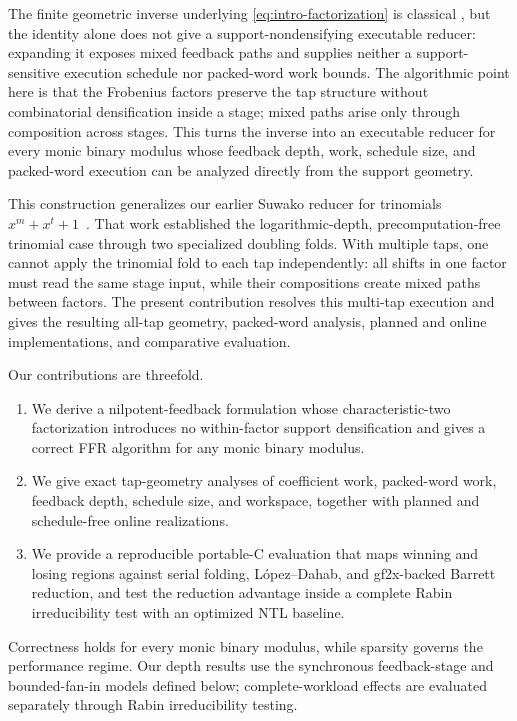 \documentclass{mcom-l}
\numberwithin{equation}{section}
\theoremstyle{definition}
\theoremstyle{remark}
\begin{document}
The finite geometric inverse underlying
\eqref{eq:intro-factorization} is classical
\cite{BiniPan1985,Kalorkoti1993}, but the identity alone does not give a
support-nondensifying executable reducer: expanding it exposes mixed feedback
paths and supplies neither a support-sensitive execution schedule nor
packed-word work bounds.
The algorithmic point here is that the Frobenius factors preserve the tap
structure without combinatorial densification inside a stage; mixed paths
arise only through composition across stages.  This turns the inverse into an
executable reducer for every monic binary modulus whose feedback depth, work,
schedule size, and packed-word execution can be analyzed directly from the
support geometry.

This construction generalizes our earlier Suwako reducer for trinomials
$x^m+x^t+1$~\cite{ZhouEtAl2025Suwako}.  That work established the
logarithmic-depth, precomputation-free trinomial case through two specialized
doubling folds.  With multiple taps, one cannot apply the trinomial fold to
each tap independently: all shifts in one factor must read the same stage
input, while their compositions create mixed paths between factors.  The
present contribution resolves this multi-tap execution and gives the resulting
all-tap geometry, packed-word analysis, planned and online implementations,
and comparative evaluation.

Our contributions are threefold.
\begin{enumerate}
\item We derive a nilpotent-feedback formulation whose characteristic-two
      factorization introduces no within-factor support densification and
      gives a correct FFR algorithm for any monic binary modulus.
\item We give exact tap-geometry analyses of coefficient work, packed-word
      work, feedback depth, schedule size, and workspace, together with
      planned and schedule-free online realizations.
\item We provide a reproducible portable-C evaluation that maps winning and
      losing regions against serial folding, L\'opez--Dahab, and gf2x-backed
      Barrett reduction, and test the reduction advantage inside a complete
      Rabin irreducibility test with an optimized NTL baseline.
\end{enumerate}

Correctness holds for every monic binary modulus, while sparsity governs the
performance regime.  Our depth results use the synchronous feedback-stage and
bounded-fan-in models defined below; complete-workload effects are evaluated
separately through Rabin irreducibility testing.
\end{document}
